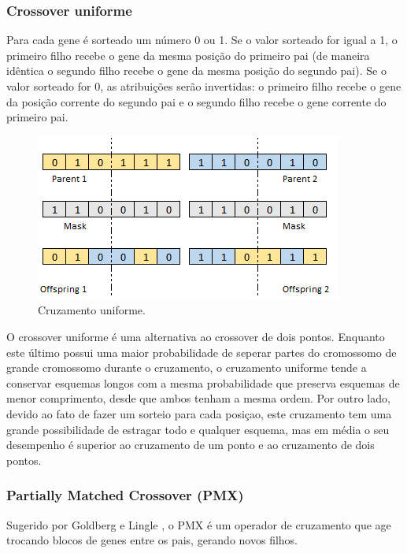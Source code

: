\documentclass[twoside]{article}
\begin{document}
\begin{multicols}{2}
\subsubsection{Crossover uniforme}
Para cada gene é sorteado um número 0 ou 1. Se o valor sorteado for igual a 1, o primeiro filho recebe o gene da mesma posição do primeiro pai (de maneira idêntica o segundo filho recebe o gene da mesma posição do segundo pai). Se o valor sorteado for 0, as atribuições serão invertidas: o primeiro filho recebe o gene da posição corrente do segundo pai e o segundo filho recebe o gene corrente do primeiro pai.


\begin{figure}[H]
\label{fig:mut}
  \caption{Cruzamento uniforme.}
  \centering
    \includegraphics[scale = 0.75]{crossover_uniform.png}
\end{figure}

O crossover uniforme é uma alternativa ao crossover de dois pontos. Enquanto este último possui uma maior probabilidade de seperar partes do cromossomo de grande cromossomo durante o cruzamento, o cruzamento uniforme tende a conservar esquemas longos com a mesma probabilidade que preserva esquemas de menor comprimento, desde que ambos tenham a mesma ordem. Por outro lado, devido ao fato de fazer um sorteio para cada posiçao, este cruzamento tem uma grande possibilidade de estragar todo e qualquer esquema, mas em média o seu desempenho é superior ao cruzamento de um ponto e ao cruzamento de dois pontos.

\subsubsection{Partially Matched Crossover (PMX)}
Sugerido por Goldberg e Lingle , o PMX é um operador de cruzamento que age trocando blocos de genes entre os pais, gerando novos filhos.


\end{multicols}
\end{document}
